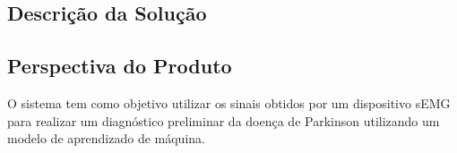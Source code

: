 \begin{anexosenv}

	\section{Descrição da Solução}

	\subsection{Perspectiva do Produto}

	O sistema tem como objetivo utilizar os sinais obtidos por um dispositivo sEMG para realizar um diagnóstico preliminar da doença de Parkinson utilizando um modelo de aprendizado de máquina.


\end{anexosenv}
